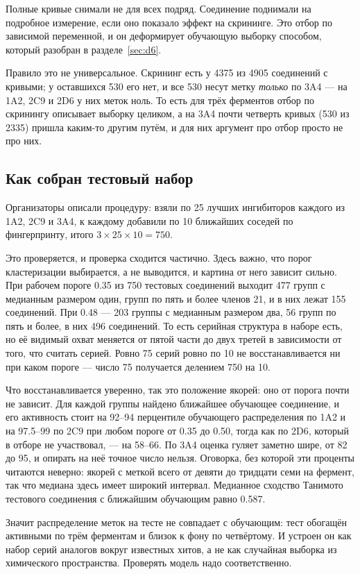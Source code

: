 Полные кривые снимали не для всех подряд. Соединение поднимали на подробное
измерение, если оно показало эффект на скрининге. Это отбор по зависимой переменной, и он деформирует
обучающую выборку способом, который разобран в разделе~\ref{sec:d6}.

Правило это не универсальное. Скрининг есть у 4375 из 4905 соединений с кривыми; у оставшихся 530 его
нет, и все 530 несут метку \emph{только} по 3A4 --- на 1A2, 2C9 и 2D6 у них меток ноль. То есть для трёх
ферментов отбор по скринингу описывает выборку целиком, а на 3A4 почти четверть кривых (530 из 2335)
пришла каким-то другим путём, и для них аргумент про отбор просто не про них.

\subsection{Как собран тестовый набор}

Организаторы описали процедуру: взяли по 25 лучших ингибиторов каждого из 1A2, 2C9 и 3A4, к каждому
добавили по 10 ближайших соседей по фингерпринту, итого $3\times 25\times 10 = 750$.

Это проверяется, и проверка сходится частично. Здесь важно, что порог кластеризации выбирается, а не
выводится, и картина от него зависит сильно. При рабочем пороге 0.35 из 750 тестовых соединений выходит
477 групп с медианным размером один, групп по пять и более членов 21, и в них лежат 155 соединений.
При 0.48 --- 203 группы с медианным размером два, 56 групп по пять и более, в них 496 соединений.
То есть серийная структура в наборе есть, но её видимый охват меняется от пятой части до двух третей
в зависимости от того, что считать серией. Ровно 75 серий ровно по 10 не восстанавливается ни при каком
пороге --- число 75 получается делением 750 на 10.

Что восстанавливается уверенно, так это положение якорей: оно от порога почти не зависит. Для каждой
группы найдено ближайшее обучающее соединение, и его активность стоит на 92--94 перцентиле обучающего
распределения по 1A2 и на 97.5--99 по 2C9 при любом пороге от 0.35 до 0.50, тогда как по 2D6, который
в отборе не участвовал, --- на 58--66. По 3A4 оценка гуляет заметно шире, от 82 до 95, и опирать на неё
точное число нельзя. Оговорка, без которой эти проценты читаются неверно: якорей с меткой всего от
девяти до тридцати семи на фермент, так что медиана здесь имеет широкий интервал. Медианное сходство
Танимото тестового соединения с ближайшим обучающим равно 0.587.

Значит распределение меток на тесте не совпадает с обучающим: тест обогащён активными по трём ферментам
и близок к фону по четвёртому. И устроен он как набор серий аналогов вокруг известных хитов, а не как
случайная выборка из химического пространства. Проверять модель надо соответственно.
